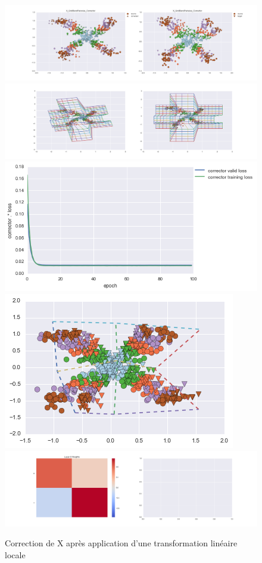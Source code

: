 \begin{figure}[H] %
\centering
\includegraphics[width=\linewidth]{fig/24-05-2016/X/X_GridBendPairwise_Corrector-DATA.png}
\includegraphics[width=\linewidth]{fig/24-05-2016/X/X_GridBendPairwise_Corrector-GridCheck.png}
\includegraphics[width=0.45\linewidth]{fig/24-05-2016/X/X_GridBendPairwise_Corrector-Learning_curve.png}
\includegraphics[width=0.45\linewidth]{fig/24-05-2016/X/X_grid.png}
\includegraphics[width=\linewidth]{fig/24-05-2016/X/X_GridBendPairwise_Corrector-W.png}
\caption{Correction de X après application d'une transformation linéaire locale}
\label{fig:recap-X-GridBend-pairwise}
\end{figure}


